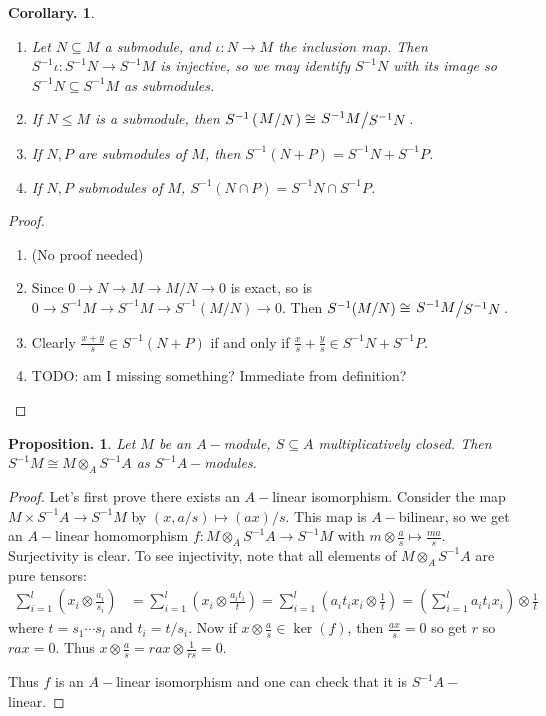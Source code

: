 \documentclass[11pt, a4paper]{memoir}
\theoremstyle{change}
\newtheorem{corollary}[theorem]{Corollary.}
\newtheorem{proposition}[theorem]{Proposition.}
\theoremstyle{plain}
\theoremstyle{nonumberplain}
\newtheorem{proof}{Proof}
\newcommand{\quot}[2]{\mathchoice{\left.\raisebox{0.12em}{$#1$}\middle/\raisebox{-0.12em}{$#2$}\right.}
                                 {\left.\raisebox{0.06em}{$#1$}\middle/\raisebox{-0.06em}{$#2$}\right.}
                                 {\left.\raisebox{0.02em}{$#1$}\middle/\raisebox{-0.02em}{$#2$}\right.}
                                 {\left.\raisebox{0em}{$#1$}\middle/\raisebox{0em}{$#2$}\right.}}
\numberwithin{equation}{section}
\begin{document}
\begin{corollary}
    \begin{enumerate}[nolistsep]
        \item Let $N\subseteq M$ a submodule, and $\iota:N\to M$ the inclusion map.
            Then $S^{-1}\iota:S^{-1}N\to S^{-1}M$ is injective, so we may identify $S^{-1}N$ with its image so $S^{-1}N\subseteq S^{-1}M$ as submodules.
        \item If $N\leq M$ is a submodule, then $S^{-1}\left(\quot{M}{N}\right)\cong\quot{S^{-1}M}{S^{-1}N}$.
        \item If $N,P$ are submodules of $M$, then $S^{-1}(N+P)=S^{-1}N+S^{-1}P$.
        \item If $N,P$ submodules of $M$, $S^{-1}(N\cap P)=S^{-1}N\cap S^{-1}P$.
    \end{enumerate}
\end{corollary}
\begin{proof}
    \begin{enumerate}[nolistsep]
        \item (No proof needed)
        \item Since $0\to N\to M\to M/N\to 0$ is exact, so is $0\to S^{-1}M\to S^{-1}M\to S^{-1}(M/N)\to 0$.
            Then $S^{-1}(M/N)\cong \quot{S^{-1}M}{S^{-1}N}$.
        \item Clearly $\frac{x+y}{s}\in S^{-1}(N+P)$ if and only if $\frac{x}{s}+\frac{y}{s}\in S^{-1}N+S^{-1}P$.
        \item TODO: am I missing something? Immediate from definition?
    \end{enumerate}
\end{proof}
\begin{proposition}
    Let $M$ be an $A-$module, $S\subseteq A$ multiplicatively closed.
    Then $S^{-1}M\cong M\otimes_A S^{-1}A$ as $S^{-1}A-$modules.
\end{proposition}
\begin{proof}
    Let's first prove there exists an $A-$linear isomorphism.
    Consider the map $M\times S^{-1}A\to S^{-1}M$ by $(x,a/s)\mapsto (ax)/s$.
    This map is $A-$bilinear, so we get an $A-$linear homomorphism $f:M\otimes_A S^{-1}A\to S^{-1}M$ with $m\otimes\frac{a}{s}\mapsto\frac{ma}{s}$.
    Surjectivity is clear.
    To see injectivity, note that all elements of $M\otimes_A S^{-1}A$ are pure tensors:
    \begin{align*}
        \sum_{i=1}^l\left(x_i\otimes\frac{a_i}{s_i}\right)&=\sum_{i=1}^l\left(x_i\otimes \frac{a_it_i}{t}\right)= \sum_{i=1}^l\left(a_it_ix_i\otimes\frac{1}{t}\right)=\left(\sum_{i=1}^l a_it_ix_i\right)\otimes\frac{1}{t}
    \end{align*}
    where $t=s_1\cdots s_l$ and $t_i=t/s_i$.
    Now if $x\otimes\frac{a}{s}\in\ker(f)$, then $\frac{ax}{s}=0$ so get $r$ so $rax=0$.
    Thus $x\otimes\frac{a}{s}=rax\otimes\frac{1}{rs}=0$.

    Thus $f$ is an $A-$linear isomorphism and one can check that it is $S^{-1}A-$linear.
\end{proof}
\end{document}
